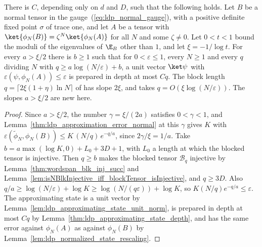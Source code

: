 \begin{lemma}
    \label{thm:ldp_depth_upper_bound_slope}
    \leanok
    There is $C$, depending only on $d$ and $D$, such that the following holds.
    Let $B$ be a normal tensor in the gauge~(\ref{eq:ldp_normal_gauge}), with a
    positive definite fixed point $\sigma$ of trace one, and let $A$ be a tensor
    with $\ket{\phi_N(B)}=\zeta^N\ket{\phi_N(A)}$ for all $N$ and some
    $\zeta\neq0$. Let $0<t<1$ bound the moduli of the eigenvalues of $\E_B$ other
    than $1$, and let $\xi=-1/\log t$. For every $a>\xi/2$ there is $b\ge1$ such
    that for $0<\varepsilon\le1$, every $N\ge1$ and every $q$ dividing $N$ with
    $q\ge a\log(N/\varepsilon)+b$, a unit vector $\ket\psi$ with
    $\varepsilon(\psi,\phi_N(A))\le\varepsilon$ is prepared in depth at most $Cq$.
    The block length $q=\lceil2\xi(1+\eta)\ln N\rceil$ of
    \cite[paragraph after Lemma~1]{Malz2024Preparation} has slope $2\xi$, and
    \cite[App.~B4, eq.~(S54)]{Murota2026ExactLogDepth} takes
    $q=O(\xi\log(N/\varepsilon))$. The slopes $a>\xi/2$ are new here.
\end{lemma}
\begin{proof}
    \leanok
    Since $a>\xi/2$, the number $\gamma=\xi/(2a)$ satisfies $0<\gamma<1$, and
    Lemma~\ref{thm:ldp_approximation_error_normal} at this $\gamma$ gives $K$
    with $\varepsilon(\widetilde\phi_N,\phi_N(B))\le K\,(N/q)\,e^{-q/a}$, since
    $2\gamma/\xi=1/a$. Take $b=a\max(\log K,0)+L_0+3D+1$, with $L_0$ a length at
    which the blocked tensor is injective. Then $q\ge b$ makes the blocked
    tensor $\mathcal B_q$ injective by
    Lemma~\ref{thm:wordspan_blk_inj_succ} and
    Lemma~\ref{lem:isNBlkInjective_iff_blockTensor_isInjective}, and $q\ge3D$.
    Also $q/a\ge\log(N/\varepsilon)+\log K\ge\log(N/(q\varepsilon))+\log K$,
    so $K(N/q)e^{-q/a}\le\varepsilon$. The approximating state is a unit vector
    by Lemma~\ref{lem:ldp_approximating_state_unit_norm}, is prepared in depth at
    most $Cq$ by Lemma~\ref{thm:ldp_approximating_state_depth}, and has the
    same error against $\phi_N(A)$ as against $\phi_N(B)$ by
    Lemma~\ref{lem:ldp_normalized_state_rescaling}.
\end{proof}

